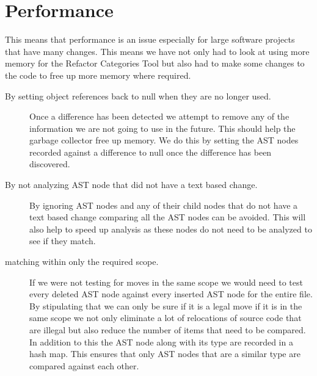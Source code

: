 
\section{Performance}
 This means that performance is an issue especially for large software projects that have many changes. This means we have not only had to look at using more memory for the Refactor Categories Tool but also had to make some changes to the code to free up more memory where required.

\begin{description}
 \item [By setting object references back to null when they are no longer used.]
  Once a difference has been detected we attempt to remove any of the information we are not going to use in the future.  This should help the garbage collector free up memory. We do this by setting the AST nodes recorded against a difference to null once the difference has been discovered. 
\item [By not analyzing AST node that did not have a text based change.] 
  By ignoring AST nodes and any of their child nodes that do not have a text based change comparing all the AST nodes can be avoided.  This will also help to speed up analysis as these nodes do not need to be analyzed to see if they match.
\item [matching within only the required scope.]
  If we were not testing for moves in the same scope we would need to test every deleted AST node against every inserted AST node for the entire file. By stipulating that we can only be sure if it is a legal move if it is in the same scope we not only eliminate a lot of relocations of source code that are illegal but also reduce the number of items that need to be compared. In addition to this the AST node along with its type are recorded in a hash map.  This ensures that only AST nodes that are a similar type are compared against each other.
\end{description}

